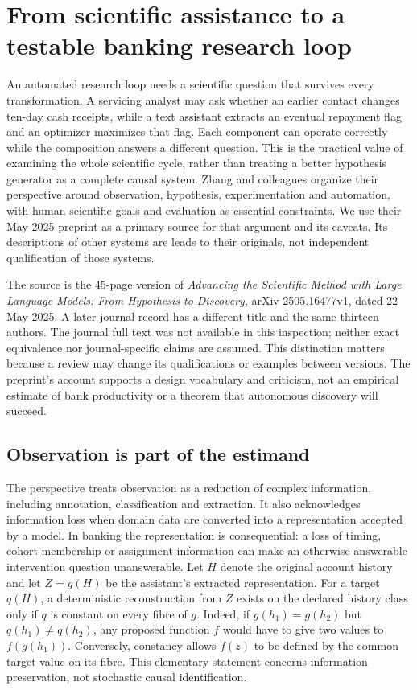 \section{From scientific assistance to a testable banking research loop}
\label{sec:exec24-scientific-method}

An automated research loop needs a scientific question that survives every transformation.
A servicing analyst may ask whether an earlier contact changes ten-day cash receipts,
while a text assistant extracts an eventual repayment flag and an optimizer maximizes
that flag. Each component can operate correctly while the composition answers a
different question. This is the practical value of examining the whole scientific
cycle, rather than treating a better hypothesis generator as a complete causal system.
Zhang and colleagues organize their perspective around observation, hypothesis,
experimentation and automation, with human scientific goals and evaluation as essential
constraints. We use their May 2025 preprint as a primary source for that argument
and its caveats. Its descriptions of other systems are leads to their originals,
not independent qualification of those systems.\citep{exec24_scimethod_original}

The source is the 45-page version of \emph{Advancing the Scientific Method with Large
Language Models: From Hypothesis to Discovery}, arXiv 2505.16477v1, dated 22 May 2025.
A later journal record has a different title and the same thirteen authors. The
journal full text was not available in this inspection; neither exact equivalence
nor journal-specific claims are assumed. This distinction matters because a review
may change its qualifications or examples between versions. The preprint's account
supports a design vocabulary and criticism, not an empirical estimate of bank
productivity or a theorem that autonomous discovery will succeed.

\subsection{Observation is part of the estimand}

The perspective treats observation as a reduction of complex information, including
annotation, classification and extraction. It also acknowledges information loss when
domain data are converted into a representation accepted by a model. In banking the
representation is consequential: a loss of timing, cohort membership or assignment
information can make an otherwise answerable intervention question unanswerable.
Let $H$ denote the original account history and let $Z=g(H)$ be the assistant's
extracted representation. For a target $q(H)$, a deterministic reconstruction from
$Z$ exists on the declared history class only if $q$ is constant on every fibre
of $g$. Indeed, if $g(h_1)=g(h_2)$ but $q(h_1)\ne q(h_2)$, any proposed function
$f$ would have to give two values to $f(g(h_1))$. Conversely, constancy allows
$f(z)$ to be defined by the common target value on its fibre. This elementary
statement concerns information preservation, not stochastic causal identification.

